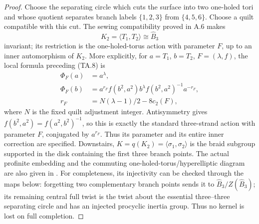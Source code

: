 \begin{proof}
Choose the separating circle which cuts the surface into two
one-holed tori and whose quotient separates branch labels
$\{1,2,3\}$ from $\{4,5,6\}$. Choose a quilt compatible with this
cut. The sewing compatibility proved in A.6 makes
\[
 K_2=\langle T_1,T_2\rangle\cong\widehat B_3
\]
invariant; its restriction is the one-holed-torus action with
parameter $F$, up to an inner automorphism of $K_2$.
More explicitly, for $a=T_1$, $b=T_2$, $F=(\lambda,f)$, the local
formula preceding (TA.8) is
\[
\begin{aligned}
 \Phi_F(a)&=a^\lambda,\\
 \Phi_F(b)&=a^{r_F}f(b^2,a^2)b^\lambda
                         f(b^2,a^2)^{-1}a^{-r_F},\\
 r_F&=N(\lambda-1)/2-8c_2(F),
\end{aligned}
\]
where $N$ is the fixed quilt adjustment integer. Antisymmetry gives
$f(b^2,a^2)=f(a^2,b^2)^{-1}$, so this is exactly the standard
three-strand action with parameter $F$, conjugated by $a^{r_F}$.
Thus its parameter and its entire inner correction are specified.
Downstairs,
$K=q(K_2)=\langle\sigma_1,\sigma_2\rangle$ is the braid subgroup
supported in the disk containing the first three branch points.
The actual profinite embedding and the commuting
one-holed-torus/hyperelliptic diagram are also given in
\cite[Lemma 3.2 and its proof]{ET_NS2000}.
For completeness, its injectivity can be checked through the maps
below: forgetting two complementary branch points sends it to
$\widehat B_3/Z(\widehat B_3)$; its remaining central full twist is
the twist about the essential three--three separating circle and
has an injected procyclic inertia group. Thus no kernel is lost
on full completion.


\end{proof}
